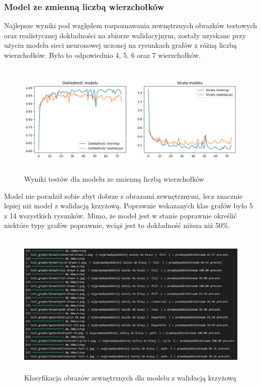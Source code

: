 \subsubsection{Model ze zmienną liczbą wierzchołków}
Najlepsze wyniki pod względem rozpoznawania zewnętrznych obrazków testowych
oraz realistycznej dokładności na zbiorze walidacyjnym,
zostały uzyskane przy użyciu modelu sieci neuronowej uczonej na rysunkach grafów z różną liczbą wierzchołków.
Było to odpowiednio 4, 5, 6 oraz 7 wierzchołków.

\begin{figure}[ht]
	\centering
	\includegraphics[height=5.5cm]{partials/images/tests/v2_multiple_edges_epoch75.png}
	\caption{Wyniki testów dla modelu ze zmienną liczbą wierzchołków}
	\label{Fig:tests-var-1}
\end{figure}
\FloatBarrier

Model nie poradził sobie zbyt dobrze z obrazami zewnętrznymi, lecz znacznie lepiej niż model z walidacją krzyżową.
Poprawnie wskazanych klas grafów było 5 z 14 wszystkich rysunków.
Mimo, że model jest w stanie poprawnie określić niektóre typy grafów poprawnie,
wciąż jest to dokładność niższa niż 50\%.

\begin{figure}[ht]
	\centering
	\includegraphics[height=7cm]{partials/images/tests/v2_multiple_edges_epoch75_img_tests.png}
	\caption{Klasyfikacja obrazów zewnętrznych dla modelu z walidacją krzyżową}
	\label{Fig:tests-var-2}
\end{figure}
\FloatBarrier

